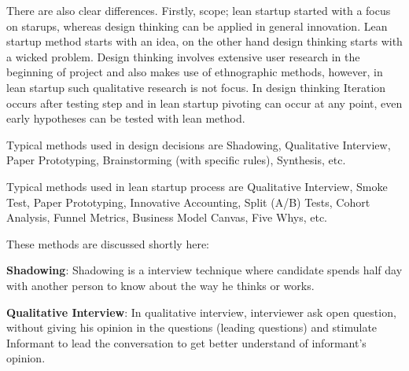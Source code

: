 There are also clear differences. Firstly, scope; lean startup started with a focus on starups, whereas design thinking can be applied in general innovation. Lean startup method starts with an idea, on the other hand design thinking starts with a wicked problem. Design thinking involves extensive user research in the beginning of project and also makes use of ethnographic methods, however, in lean startup such qualitative research is not focus. In design thinking Iteration occurs after testing step and in lean startup pivoting can occur at any point, even early hypotheses can be tested with lean method.
 





Typical methods used in design decisions are Shadowing, Qualitative Interview, Paper Prototyping, Brainstorming (with specific rules), Synthesis, etc.  

Typical methods used in lean startup process are Qualitative Interview, Smoke Test, Paper Prototyping, Innovative Accounting, Split (A/B) Tests, Cohort Analysis, Funnel Metrics, Business Model Canvas, Five Whys, etc.

These methods are discussed shortly here:

\textbf{Shadowing}: Shadowing is a interview technique where candidate spends half day with another person to know about the way he thinks or works.

\textbf{Qualitative Interview}: In qualitative interview, interviewer ask open question, without giving his opinion in the questions (leading questions) and stimulate Informant to lead the conversation to get better understand of informant's opinion.

